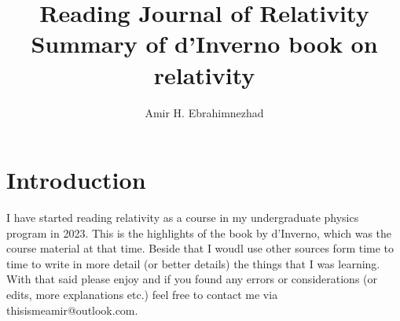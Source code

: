 \documentclass[10pt,a4paper,twocolumn]{article}
\title{Reading Journal of Relativity \\ \large Summary of d'Inverno book on relativity}
\author{Amir H. Ebrahimnezhad}
\date{}
\begin{document}
            \maketitle
            \section*{Introduction}
            I have started reading relativity as a course in my undergraduate physics program in 2023. This is the highlights of the book by d'Inverno, which was the course material at that time. Beside that I woudl use other sources form time to time to write in more detail (or better details) the things that I was learning. With that said please enjoy and if you found any errors or considerations (or edits, more explanations etc.) feel free to contact me via thisismeamir@outlook.com.

            \tableofcontents
            \newpage
\end{document}
